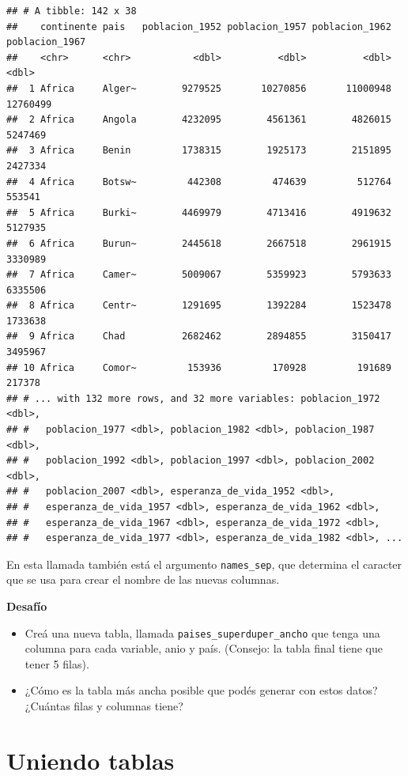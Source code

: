 \documentclass[
  openany]{book}
\begin{document}
\begin{verbatim}
## # A tibble: 142 x 38
##    continente pais   poblacion_1952 poblacion_1957 poblacion_1962 poblacion_1967
##    <chr>      <chr>           <dbl>          <dbl>          <dbl>          <dbl>
##  1 Africa     Alger~        9279525       10270856       11000948       12760499
##  2 Africa     Angola        4232095        4561361        4826015        5247469
##  3 Africa     Benin         1738315        1925173        2151895        2427334
##  4 Africa     Botsw~         442308         474639         512764         553541
##  5 Africa     Burki~        4469979        4713416        4919632        5127935
##  6 Africa     Burun~        2445618        2667518        2961915        3330989
##  7 Africa     Camer~        5009067        5359923        5793633        6335506
##  8 Africa     Centr~        1291695        1392284        1523478        1733638
##  9 Africa     Chad          2682462        2894855        3150417        3495967
## 10 Africa     Comor~         153936         170928         191689         217378
## # ... with 132 more rows, and 32 more variables: poblacion_1972 <dbl>,
## #   poblacion_1977 <dbl>, poblacion_1982 <dbl>, poblacion_1987 <dbl>,
## #   poblacion_1992 <dbl>, poblacion_1997 <dbl>, poblacion_2002 <dbl>,
## #   poblacion_2007 <dbl>, esperanza_de_vida_1952 <dbl>,
## #   esperanza_de_vida_1957 <dbl>, esperanza_de_vida_1962 <dbl>,
## #   esperanza_de_vida_1967 <dbl>, esperanza_de_vida_1972 <dbl>,
## #   esperanza_de_vida_1977 <dbl>, esperanza_de_vida_1982 <dbl>, ...
\end{verbatim}

En esta llamada también está el argumento \texttt{names\_sep}, que determina el caracter que se usa para crear el nombre de las nuevas columnas.

\textbf{Desafío}

\begin{itemize}
\item
  Creá una nueva tabla, llamada \texttt{paises\_superduper\_ancho} que tenga una columna para cada variable, anio y país.
  (Consejo: la tabla final tiene que tener 5 filas).
\item
  ¿Cómo es la tabla más ancha posible que podés generar con estos datos?
  ¿Cuántas filas y columnas tiene?
\end{itemize}

\hypertarget{uniendo-tablas}{%
\section{Uniendo tablas}\label{uniendo-tablas}}
\end{document}
